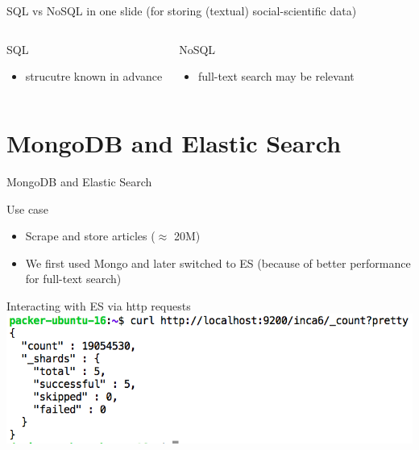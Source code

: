 \documentclass{beamer}
\begin{document}
\begin{frame}{SQL vs NoSQL in one slide}
(for storing (textual) social-scientific data)

\begin{columns}
\begin{block}{SQL}
	\begin{itemize}
		\item strucutre known in advance
	\end{itemize}
\end{block}

\begin{block}{NoSQL}
		\begin{itemize}
			\item full-text search may be relevant
		\end{itemize}
\end{block}
\end{columns}


\end{frame}



\section{MongoDB and Elastic Search}


\begin{frame}[plain]
	MongoDB and Elastic Search
\end{frame}


\begin{frame}[<+->]{Use case}
	\begin{itemize}
		\item Scrape and store articles ($\approx$ 20M)
		\item We first used Mongo and later switched to ES (because of better performance for full-text search)
	\end{itemize}
\end{frame}


\begin{frame}{Interacting with ES via http requests}
	\includegraphics[width=\columnwidth,height=\paperheight,keepaspectratio]{curl}
\end{frame}
\end{document}

